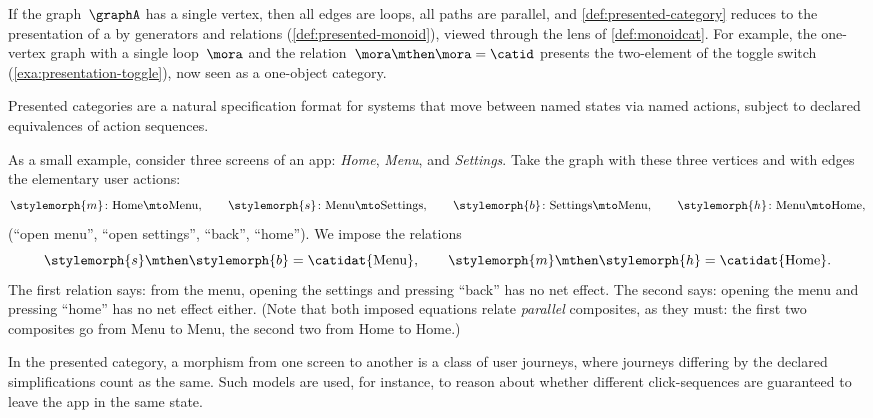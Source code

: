 \begin{example}
    \label{exa:presented-cat-monoid}
    If the graph~$\graphA$ has a single vertex, then all edges are loops, all paths are parallel, and \cref{def:presented-category} reduces to the presentation of a  by generators and relations (\cref{def:presented-monoid}), viewed through the lens of \cref{def:monoidcat}.
    For example, the one-vertex graph with a single loop~$\mora$ and the relation~$\mora \mthen \mora = \catid$ presents the two-element  of the toggle switch (\cref{exa:presentation-toggle}), now seen as a one-object category.
\end{example}

\begin{example}
    \label{exa:presented-cat-ui}
    Presented categories are a natural specification format for systems that move between named states via named actions, subject to declared equivalences of action sequences.

    As a small example, consider three screens of an app: \emph{Home}, \emph{Menu}, and \emph{Settings}.
    Take the graph with these three vertices and with edges the elementary user actions:
    \begin{equation}
        \stylemorph{m} \colon \text{Home} \mto \text{Menu}, \qquad
        \stylemorph{s} \colon \text{Menu} \mto \text{Settings}, \qquad
        \stylemorph{b} \colon \text{Settings} \mto \text{Menu}, \qquad
        \stylemorph{h} \colon \text{Menu} \mto \text{Home},
    \end{equation}
    (``open menu'', ``open settings'', ``back'', ``home'').
    We impose the relations
    \begin{equation}
        \stylemorph{s} \mthen \stylemorph{b} = \catidat{\text{Menu}},
        \qquad
        \stylemorph{m} \mthen \stylemorph{h} = \catidat{\text{Home}}.
    \end{equation}
    The first relation says: from the menu, opening the settings and pressing ``back'' has no net effect.
    The second says: opening the menu and pressing ``home'' has no net effect either.
    (Note that both imposed equations relate \emph{parallel} composites, as they must: the first two composites go from Menu to Menu, the second two from Home to Home.)

    In the presented category, a morphism from one screen to another is a class of user journeys, where journeys differing by the declared simplifications count as the same.
    Such models are used, for instance, to reason about whether different click-sequences are guaranteed to leave the app in the same state.
\end{example}

